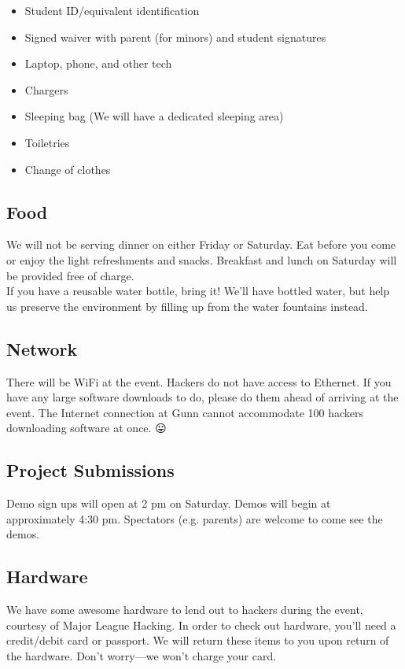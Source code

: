 \documentclass[12pt,onesided,letterpaper]{article}
\begin{document}
\begin{itemize}
\item Student ID\slash equivalent identification
\item Signed waiver with parent (for minors) and student signatures
\item Laptop, phone, and other tech
\item Chargers
\item Sleeping bag (We will have a dedicated sleeping area)
\item Toiletries
\item Change of clothes
\end{itemize}

\subsection*{Food}

We will not be serving dinner on either Friday or Saturday. Eat before you come or enjoy the light refreshments and snacks. Breakfast and lunch on Saturday will be provided free of charge.\\

If you have a reusable water bottle, bring it! We'll have bottled water, but help us preserve the environment by filling up from the water fountains instead.

\subsection*{Network}

There will be WiFi at the event. Hackers do not have access to Ethernet. If you have any large software downloads to do, please do them ahead of arriving at the event. The Internet connection at Gunn cannot accommodate 100 hackers downloading software at once. {\DejaSans 😛}

\subsection*{Project Submissions}

Demo sign ups will open at 2 pm on Saturday. Demos will begin at approximately 4:30 pm. Spectators (e.g. parents) are welcome to come see the demos.

\subsection*{Hardware}

We have some awesome hardware to lend out to hackers during the event, courtesy of Major League Hacking. In order to check out hardware, you'll need a credit\slash debit card or passport. We will return these items to you upon return of the hardware. Don't worry---we won't charge your card.\\
\end{document}
